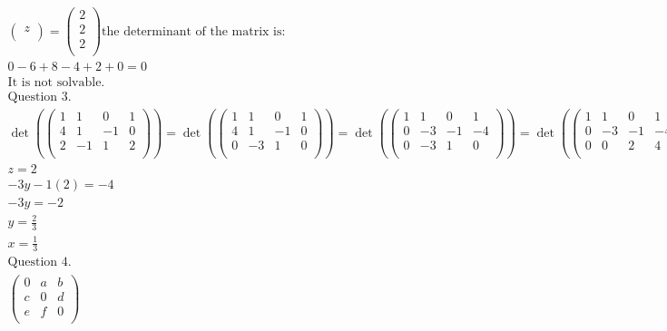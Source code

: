 \documentclass{article}
\begin{document}
\begin{align*}
\begin{pmatrix}
        z \\
    \end{pmatrix}
    =
    \begin{pmatrix}
        2 \\
        2 \\
        2 \\
    \end{pmatrix}
    \textrm{the determinant of the matrix is:} \\
    0 - 6 + 8 - 4 + 2 + 0 = 0 \\
    \textrm{It is not solvable.} \\
    \textrm{Question 3.} \\
    \det(
    \begin{pmatrix}
        1 & 1 & 0 & 1\\
        4 & 1 & -1 & 0\\
        2 & -1 & 1 & 2\\
    \end{pmatrix})
    =
    \det(
    \begin{pmatrix}
        1 & 1 & 0 & 1\\
        4 & 1 & -1 & 0\\
        0 & -3 & 1 & 0\\
    \end{pmatrix})
    =
    \det(
    \begin{pmatrix}
        1 & 1 & 0 & 1\\
        0 & -3 & -1 & -4\\
        0 & -3 & 1 & 0\\
    \end{pmatrix}
    )
    =
    \det(
    \begin{pmatrix}
        1 & 1 & 0 & 1\\
        0 & -3 & -1 & -4\\
        0 & 0 & 2 & 4\\
    \end{pmatrix}
    ) \\
    z = 2 \\
    -3y -1(2) = -4 \\
    -3y = -2 \\
    y = \frac{2}{3} \\
    x = \frac{1}{3} \\
    \textrm{Question 4.} \\
    \begin{pmatrix}
    0 & a & b\\
    c & 0 & d\\
    e & f & 0\\
    \end{pmatrix}
\end{align*}
\end{document}
